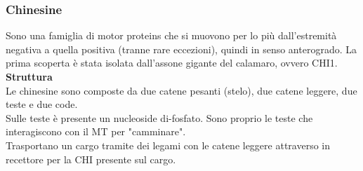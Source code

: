         \subsubsection{Chinesine}
            Sono una famiglia di motor proteins che si muovono per lo più dall'estremità negativa a quella positiva (tranne rare eccezioni), quindi in senso anterogrado. La prima scoperta è stata isolata dall'assone gigante del calamaro, ovvero CHI1.\\
            
            \textbf{Struttura} \\
                Le chinesine sono composte da due catene pesanti (stelo), due catene leggere, due teste e due code. \\
                Sulle teste è presente un nucleoside di-fosfato. Sono proprio le teste che interagiscono con il MT per "camminare".\\
                Trasportano un cargo tramite dei legami con le catene leggere attraverso in recettore per la CHI presente sul cargo.\\
            
